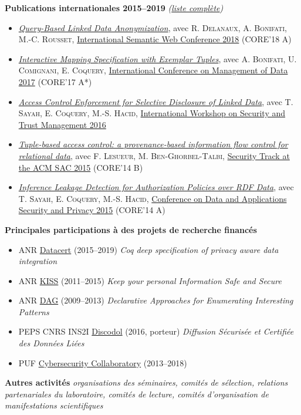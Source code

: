 \documentclass[12pt,a4paper]{article}
\newcommand{\activite}[1]{\textbf{#1}\xspace}
\newcommand{\comment}[1]{\textsl{#1}\xspace}
\begin{document}
\activite{Publications internationales 2015--2019} \comment{(\href{{https://dblp.org/pers/hd/t/Thion:Romuald}}{liste complète})}
  \begin{itemize}
    \item \href{https://hal.archives-ouvertes.fr/hal-01896276/}{\emph{Query-Based Linked Data Anonymization}}, avec \textsc{R. Delanaux, A. Bonifati, M.-C. Rousset},
          \href{http://iswc2018.semanticweb.org/}{International Semantic Web Conference 2018} (CORE'18 A)

    \item \href{https://hal.archives-ouvertes.fr/hal-01548855/}{\emph{Interactive Mapping Specification with Exemplar Tuples}}, avec \textsc{A. Bonifati, U. Comignani, E. Coquery},
          \href{https://sigmod2017.org/}{International Conference on Management of Data 2017} (CORE'17 A*)
          
    \item \href{https://hal.archives-ouvertes.fr/hal-01371530}{\emph{Access Control Enforcement for Selective Disclosure of Linked Data}}, avec \textsc{T. Sayah, E. Coquery, M.-S. Hacid}, 
\href{http://stm2016.ics.forth.gr/}{International Workshop on Security and Trust Management 2016}
 
    \item \href{https://hal.archives-ouvertes.fr/hal-01192900v1}{\emph{Tuple-based access control: a provenance-based information flow control for relational data}}, avec \textsc{F. Lesueur, M. Ben-Ghorbel-Talbi},
 \href{http://www.sigapp.org/sac/sac2015/}{Security Track at the ACM SAC 2015} (CORE'14 B)
 

    \item \href{https://hal.inria.fr/hal-01745813}{\emph{Inference Leakage Detection for Authorization Policies over RDF Data}}, avec \textsc{T. Sayah, E. Coquery, M.-S. Hacid}, 
 \href{http://dbsec2015.di.unimi.it/}{Conference on Data and Applications Security and Privacy 2015} (CORE'14 A)
  \end{itemize}

\activite{Principales participations à des projets de recherche financés}  
\begin{itemize}
  \item ANR \href{http://datacert.lri.fr/}{Datacert} (2015--2019) \emph{Coq deep specification of privacy aware data integration} %
  \item ANR \href{https://project.inria.fr/smis/anr-kiss-dec-2011-dec-2015/}{KISS} (2011--2015) \emph{Keep your personal Information Safe and Secure} %
  \item ANR \href{https://projet.liris.cnrs.fr/dag/}{DAG} (2009--2013) \emph{Declarative Approaches for Enumerating Interesting Patterns}
  \item PEPS CNRS INS2I \href{http://archives.cnrs.fr/ins2i/?r=discodol}{Discodol} (2016, porteur) \emph{Diffusion Sécurisée et Certifiée des Données Liées} %
    \item PUF \href{https://projet.liris.cnrs.fr/cyber/}{Cybersecurity Collaboratory} (2013--2018)
\end{itemize}

\activite{Autres activités} \comment{organisations des séminaires, comités de sélection, relations partenariales du laboratoire, comités de lecture, comités d'organisation de manifestations scientifiques}
\end{document}
